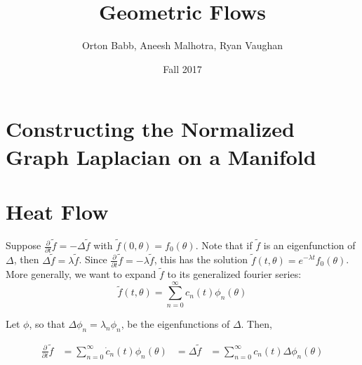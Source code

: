 \documentclass{article}
\title{Geometric Flows}
\author{Orton Babb, Aneesh Malhotra, Ryan Vaughan}
\date{Fall 2017}
\begin{document}
\maketitle

\section{Constructing the Normalized Graph Laplacian on a Manifold}

\section{Heat Flow}

Suppose $\frac{\partial}{\partial t} \tilde{f} = - \Delta \tilde{f}$ with $\tilde{f}(0, \theta) = f_0(\theta)$. Note that if $\tilde{f}$ is an eigenfunction of $\Delta$, then $\Delta\tilde{f}=\lambda \tilde{f}$. Since $\frac{\partial}{\partial t} \tilde{f} = - \lambda \tilde{f}$, this has the solution $\tilde{f}(t, \theta) = e^{-\lambda t}f_0 (\theta)$. More generally, we want to expand $\tilde{f}$ to its generalized fourier series:
$$ \tilde{f}(t,\theta) = \sum_{n=0}^{\infty} c_n(t)\phi_n(\theta)$$

Let $\phi$, so that  $\Delta \phi_n = \lambda_n \phi_n $, be the eigenfunctions of $\Delta$. Then,

\begin{align*}
\frac{\partial}{\partial t} \tilde{f} &= \sum_{n=0}^{\infty} \dot{c}_n(t)\phi_n(\theta) &= \Delta \tilde{f} &= \sum_{n=0}^{\infty} c_n(t) \Delta \phi_n(\theta) \\
\end{align*}
\end{document}
